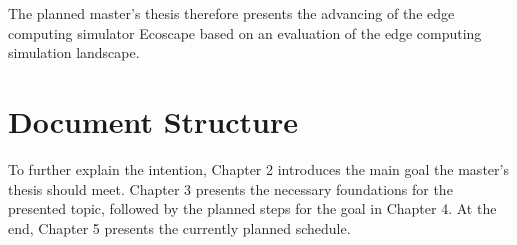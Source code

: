   
  The planned master's thesis therefore presents the advancing of the edge computing simulator Ecoscape based on an evaluation of the edge computing simulation landscape.

\section{Document Structure}
To further explain the intention, Chapter 2 introduces the main goal the master's thesis should meet.
Chapter 3 presents the necessary foundations for the presented topic, followed by the planned steps for the goal in Chapter 4.
At the end, Chapter 5 presents the currently planned schedule.
